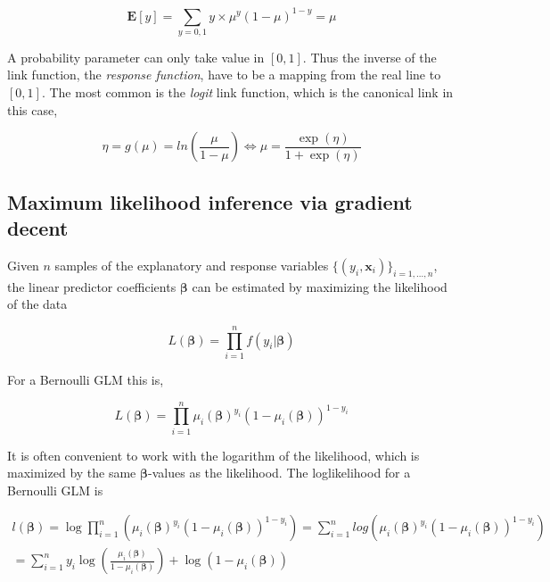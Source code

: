 \begin{equation}
\mathbf{E} [y] = \sum_{y = 0,1} y \times \mu^{y}(1-\mu)^{1-y} = \mu
\end{equation}

A probability parameter can only take value in $[0,1]$. Thus the inverse of the link function, the \textit{response function}, have to be a mapping from the real line to $[0,1]$. The most common is the \textit{logit} link function, which is the canonical link in this case,

\begin{equation}
    \eta = g(\mu) = ln(\frac{\mu}{1-\mu}) \Leftrightarrow 
    \mu = \frac{\exp(\eta)}{1+\exp(\eta)}
\end{equation}


\subsection{Maximum likelihood inference via gradient decent}
\label{sec:Inference}

Given $n$ samples of the explanatory and response variables $\{(y_i,\mathbf{x}_i)\}_{i=1,...,n}$, the linear predictor coefficients $\bm {\beta}$ can be estimated by maximizing the likelihood of the data

\begin{equation}
    L(\bm{\beta}) = \prod_{i=1}^{n} f(y_i |\bm{ \beta})
\end{equation}

For a Bernoulli GLM this is,

\begin{equation}
    L(\bm{\beta}) = \prod_{i=1}^{n} \mu_i(\bm{\beta})^{y_i}(1-\mu_i(\bm{\beta}))^{1-y_i}
\end{equation}

It is often convenient to work with the logarithm of the likelihood, which is maximized by the same $\bm{\beta}$-values as the likelihood. The loglikelihood for a Bernoulli GLM is

\begin{equation}
\begin{split}
    l(\bm{\beta}) = \log \prod_{i=1}^{n} (\mu_i(\bm{\beta})^{y_i}(1-\mu_i(\bm{\beta}))^{1-y_i})  =
    \sum_{i=1}^n log (\mu_i(\bm{\beta})^{y_i}(1-\mu_i(\bm{\beta}))^{1-y_i})\\ =  \sum_{i=1}^{n} y_i \log(\frac{\mu_i(\bm{\beta})}{1-\mu_i(\bm{\beta})}) + \log(1-\mu_i(\bm{\beta}))
\end{split}
\end{equation}

